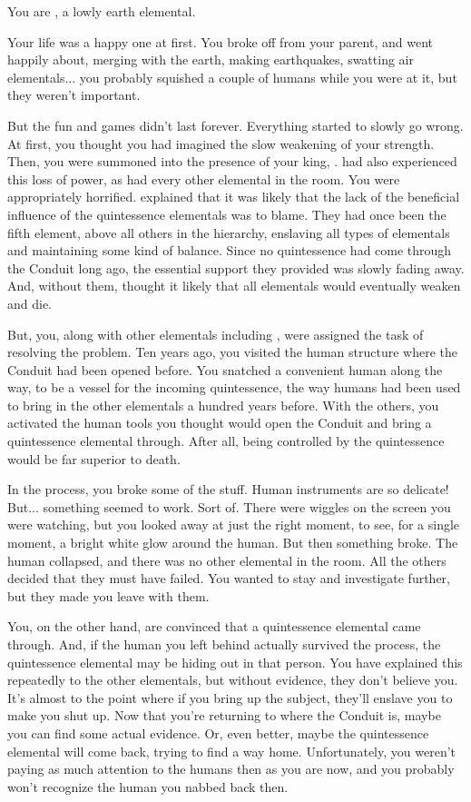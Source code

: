 \documentclass[char]{elementals}
\begin{document}
\name{\cMinion{}}

You are \cMinion{\intro}, a lowly earth elemental.

Your life was a happy one at first.  You broke off from your parent, and went happily about, merging with the earth, making earthquakes, swatting air elementals... you probably squished a couple of humans while you were at it, but they weren't important.

But the fun and games didn't last forever.  Everything started to slowly go wrong.  At first, you thought you had imagined the slow weakening of your strength.  Then, you were summoned into the presence of your king, \cEarthKing{}.  \cEarthKing{\They} had also experienced this loss of power, as had every other elemental in the room.  You were appropriately horrified.  \cEarthKing{} explained that it was likely that the lack of the beneficial influence of the quintessence elementals was to blame.  They had once been the fifth element, above all others in the hierarchy, enslaving all types of elementals and maintaining some kind of balance.  Since no quintessence had come through the Conduit long ago, the essential support they provided was slowly fading away.  And, without them, \cEarthKing{} thought it likely that all elementals would eventually weaken and die.

But, you, along with other elementals including \cLoyal{\intro}, were assigned the task of resolving the problem.  Ten years ago, you visited the human structure where the Conduit had been opened before.  You snatched a convenient human along the way, to be a vessel for the incoming quintessence, the way humans had been used to bring in the other elementals a hundred years before.  With the others, you activated the human tools you thought would open the Conduit and bring a quintessence elemental through.  After all, being controlled by the quintessence would be far superior to death.

In the process, you broke some of the stuff.  Human instruments are so delicate!  But... something seemed to work.  Sort of.  There were wiggles on the screen you were watching, but you looked away at just the right moment, to see, for a single moment, a bright white glow around the human.  But then something broke.  The human collapsed, and there was no other elemental in the room.  All the others decided that they must have failed.  You wanted to stay and investigate further, but they made you leave with them.

You, on the other hand, are convinced that a quintessence elemental came through.  And, if the human you left behind actually survived the process, the quintessence elemental may be hiding out in that person.  You have explained this repeatedly to the other elementals, but without evidence, they don't believe you.  It's almost to the point where if you bring up the subject, they'll enslave you to make you shut up.  Now that you're returning to where the Conduit is, maybe you can find some actual evidence.  Or, even better, maybe the quintessence elemental will come back, trying to find a way home.  Unfortunately, you weren't paying as much attention to the humans then as you are now, and you probably won't recognize the human you nabbed back then.
\end{document}
